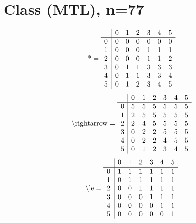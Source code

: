 \documentclass[11pt]{article}
\begin{document}
\section{Class (MTL), n=77}
\[\text{*} = 
\begin{array}{r | r r r r r r}
 & 0 & 1 & 2 & 3 & 4 & 5 \\ \hline
0 & 0 & 0 & 0 & 0 & 0 & 0 \\
1 & 0 & 0 & 0 & 1 & 1 & 1 \\
2 & 0 & 0 & 0 & 1 & 1 & 2 \\
3 & 0 & 1 & 1 & 3 & 3 & 3 \\
4 & 0 & 1 & 1 & 3 & 3 & 4 \\
5 & 0 & 1 & 2 & 3 & 4 & 5 \\
\end{array}
\]
\[\text{\textbackslash rightarrow} = 
\begin{array}{r | r r r r r r}
 & 0 & 1 & 2 & 3 & 4 & 5 \\ \hline
0 & 5 & 5 & 5 & 5 & 5 & 5 \\
1 & 2 & 5 & 5 & 5 & 5 & 5 \\
2 & 2 & 4 & 5 & 5 & 5 & 5 \\
3 & 0 & 2 & 2 & 5 & 5 & 5 \\
4 & 0 & 2 & 2 & 4 & 5 & 5 \\
5 & 0 & 1 & 2 & 3 & 4 & 5 \\
\end{array}
\]
\[\text{\textbackslash le} = 
\begin{array}{r | r r r r r r}
 & 0 & 1 & 2 & 3 & 4 & 5 \\ \hline
0 & 1 & 1 & 1 & 1 & 1 & 1 \\
1 & 0 & 1 & 1 & 1 & 1 & 1 \\
2 & 0 & 0 & 1 & 1 & 1 & 1 \\
3 & 0 & 0 & 0 & 1 & 1 & 1 \\
4 & 0 & 0 & 0 & 0 & 1 & 1 \\
5 & 0 & 0 & 0 & 0 & 0 & 1 \\
\end{array}
\]
\end{document}
